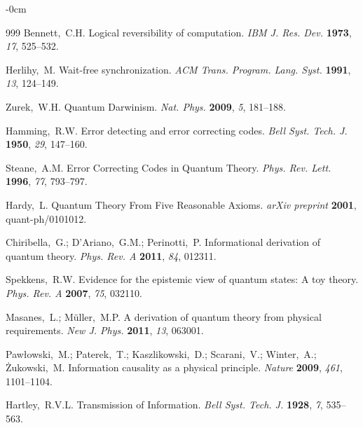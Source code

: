 \documentclass[entropy,article,submit,pdftex,oneauthor]{Definitions/mdpi}
\begin{document}
\begin{adjustwidth}{-\extralength}{0cm}
\begin{thebibliography}{999}
Bennett,~C.H. Logical reversibility of computation. \textit{IBM J. Res. Dev.} \textbf{1973}, \textit{17}, 525--532.

Herlihy,~M. Wait-free synchronization. \textit{ACM Trans. Program. Lang. Syst.} \textbf{1991}, \textit{13}, 124--149.

Zurek,~W.H. Quantum Darwinism. \textit{Nat. Phys.} \textbf{2009}, \textit{5}, 181--188.

Hamming,~R.W. Error detecting and error correcting codes. \textit{Bell Syst. Tech. J.} \textbf{1950}, \textit{29}, 147--160.

Steane,~A.M. Error Correcting Codes in Quantum Theory. \textit{Phys. Rev. Lett.} \textbf{1996}, \textit{77}, 793--797.

Hardy,~L. Quantum Theory From Five Reasonable Axioms. \textit{arXiv preprint} \textbf{2001}, quant-ph/0101012.

Chiribella,~G.; D'Ariano,~G.M.; Perinotti,~P. Informational derivation of quantum theory. \textit{Phys. Rev. A} \textbf{2011}, \textit{84}, 012311.

Spekkens,~R.W. Evidence for the epistemic view of quantum states: A toy theory. \textit{Phys. Rev. A} \textbf{2007}, \textit{75}, 032110.

Masanes,~L.; M\"uller,~M.P. A derivation of quantum theory from physical requirements. \textit{New J. Phys.} \textbf{2011}, \textit{13}, 063001.

Paw\l owski,~M.; Paterek,~T.; Kaszlikowski,~D.; Scarani,~V.; Winter,~A.; \.Zukowski,~M. Information causality as a physical principle. \textit{Nature} \textbf{2009}, \textit{461}, 1101--1104.

Hartley,~R.V.L. Transmission of Information. \textit{Bell Syst. Tech. J.} \textbf{1928}, \textit{7}, 535--563.

\end{thebibliography}

\end{adjustwidth}
\end{document}
